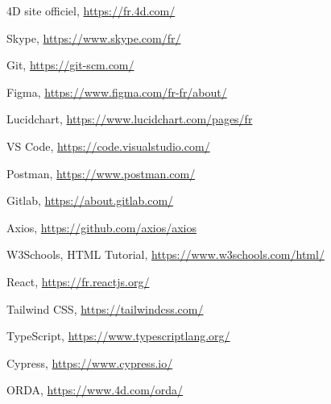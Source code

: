 
\begin{thebibliography}{9}
    
    4D site officiel,     
    \href{https://fr.4d.com/}{https://fr.4d.com/}

    Skype,
    \href{https://www.skype.com/fr/}{https://www.skype.com/fr/}

    Git,
    \href{https://git-scm.com/}{https://git-scm.com/}
   
    Figma, 
    \href{https://www.figma.com/fr-fr/about/}{https://www.figma.com/fr-fr/about/}
    
    Lucidchart,
    \href{https://www.lucidchart.com/pages/fr}{https://www.lucidchart.com/pages/fr}
    
    VS Code,
    \href{https://code.visualstudio.com/}{https://code.visualstudio.com/}
    
    Postman,
    \href{https://www.postman.com/}{https://www.postman.com/}

    Gitlab,
    \href{https://about.gitlab.com/}{https://about.gitlab.com/}

    Axios,
    \href{https://github.com/axios/axios}{https://github.com/axios/axios}
    
    W3Schools, HTML Tutorial,
    \href{https://www.w3schools.com/html/}{https://www.w3schools.com/html/}
    
    React,
    \href{https://fr.reactjs.org/}{https://fr.reactjs.org/}
    
    Tailwind CSS,
    \href{https://tailwindcss.com/}{https://tailwindcss.com/}
    
    TypeScript,
    \href{https://www.typescriptlang.org/}{https://www.typescriptlang.org/}
    
    Cypress,
    \href{https://www.cypress.io/}{https://www.cypress.io/}
    
    ORDA,
    \href{https://www.4d.com/orda/}{https://www.4d.com/orda/}


    
\end{thebibliography}
